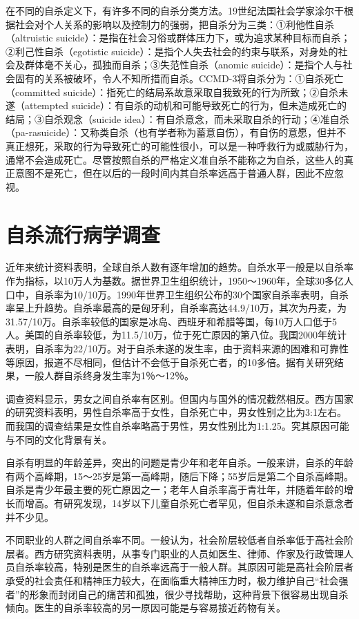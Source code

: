 在不同的自杀定义下，有许多不同的自杀分类方法。19世纪法国社会学家涂尔干根据社会对个人关系的影响以及控制力的强弱，把自杀分为三类：①利他性自杀（altruistic
suicide）：是指在社会习俗或群体压力下，或为追求某种目标而自杀；②利己性自杀（egotistic
suicide）：是指个人失去社会的约束与联系，对身处的社会及群体毫不关心，孤独而自杀；③失范性自杀（anomic
suicide）：是指个人与社会固有的关系被破坏，令人不知所措而自杀。CCMD-3将自杀分为：①自杀死亡（committed
suicide）：指死亡的结局系故意采取自我致死的行为所致；②自杀未遂（attempted
suicide）：有自杀的动机和可能导致死亡的行为，但未造成死亡的结局；③自杀观念（suicide
idea）：有自杀意念，而未采取自杀的行动；④准自杀（pa-rasuicide）：又称类自杀（也有学者称为蓄意自伤），有自伤的意愿，但并不真正想死，采取的行为导致死亡的可能性很小，可以是一种呼救行为或威胁行为，通常不会造成死亡。尽管按照自杀的严格定义准自杀不能称之为自杀，这些人的真正意图不是死亡，但在以后的一段时间内其自杀率远高于普通人群，因此不应忽视。

\section{自杀流行病学调查}

近年来统计资料表明，全球自杀人数有逐年增加的趋势。自杀水平一般是以自杀率作为指标，以10万人为基数。据世界卫生组织统计，1950～1960年，全球30多亿人口中，自杀率为10/10万。1990年世界卫生组织公布的30个国家自杀率表明，自杀率呈上升趋势。自杀率最高的是匈牙利，自杀率高达44.9/10万，其次为丹麦，为31.57/10万。自杀率较低的国家是冰岛、西班牙和希腊等国，每10万人口低于5人。美国的自杀率较低，为11.5/10万，位于死亡原因的第八位。我国2000年统计表明，自杀率为22/10万。对于自杀未遂的发生率，由于资料来源的困难和可靠性等原因，报道不尽相同，但估计不会低于自杀死亡者，的10多倍。据有关研究结果，一般人群自杀终身发生率为1％～12％。

调查资料显示，男女之间自杀率有区别。但国内与国外的情况截然相反。西方国家的研究资料表明，男性自杀率高于女性，自杀死亡中，男女性别之比为3:1左右。而我国的调查结果是女性自杀率略高于男性，男女性别比为1:1.25。究其原因可能与不同的文化背景有关。

自杀有明显的年龄差异，突出的问题是青少年和老年自杀。一般来讲，自杀的年龄有两个高峰期，15～25岁是第一高峰期，随后下降；55岁后是第二个自杀高峰期。自杀是青少年最主要的死亡原因之一；老年人自杀率高于青壮年，并随着年龄的增长而增高。有研究发现，14岁以下儿童自杀死亡者罕见，但自杀未遂和自杀意念者并不少见。

不同职业的人群之间自杀率不同。一般认为，社会阶层较低者自杀率低于高社会阶层者。西方研究资料表明，从事专门职业的人员如医生、律师、作家及行政管理人员自杀率较高，特别是医生的自杀率远高于一般人群。其原因可能是高社会阶层者承受的社会责任和精神压力较大，在面临重大精神压力时，极力维护自己“社会强者”的形象而封闭自己的痛苦和孤独，很少寻找帮助，这种背景下很容易出现自杀倾向。医生的自杀率较高的另一原因可能是与容易接近药物有关。

